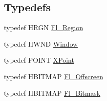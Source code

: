 \subsection*{Typedefs}
\begin{DoxyCompactItemize}
\item 
typedef H\+R\+GN \hyperlink{win32_8_h_a9c2426561f9bee9822474993f2784329}{Fl\+\_\+\+Region}
\item 
typedef H\+W\+ND \hyperlink{win32_8_h_adb48baf8a5c3aa4e6bdb2ca8112f5492}{Window}
\item 
typedef P\+O\+I\+NT \hyperlink{win32_8_h_a1ff179578a3389b4f8c2ca9ff5820851}{X\+Point}
\item 
typedef H\+B\+I\+T\+M\+AP \hyperlink{win32_8_h_af5e0de85904490a21618c8cffb95b79b}{Fl\+\_\+\+Offscreen}
\item 
typedef H\+B\+I\+T\+M\+AP \hyperlink{win32_8_h_a8a0c688d4070b7b0091480b3e090b7ca}{Fl\+\_\+\+Bitmask}
\end{DoxyCompactItemize}
